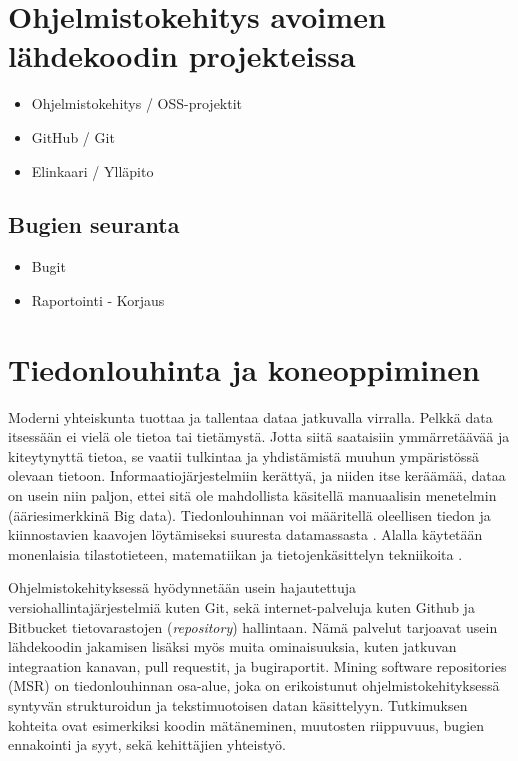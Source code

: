 \documentclass[utf8]{gradu3}
\begin{document}
\chapter{Ohjelmistokehitys avoimen lähdekoodin projekteissa}
\begin{itemize}
  \item Ohjelmistokehitys / OSS-projektit
  \item GitHub / Git
  \item Elinkaari / Ylläpito
\end{itemize}

\section{Bugien seuranta}
\begin{itemize}
  \item Bugit
  \item Raportointi - Korjaus
\end{itemize}
  
\chapter{Tiedonlouhinta ja koneoppiminen}

Moderni yhteiskunta tuottaa ja tallentaa dataa jatkuvalla virralla. Pelkkä data
itsessään ei vielä ole tietoa tai tietämystä. Jotta siitä saataisiin
ymmärretäävää ja kiteytynyttä tietoa, se vaatii tulkintaa ja yhdistämistä muuhun
ympäristössä olevaan tietoon. %
Informaatiojärjestelmiin kerättyä, ja niiden itse
keräämää, dataa on usein niin paljon, ettei sitä ole mahdollista käsitellä
manuaalisin menetelmin (ääriesimerkkinä Big data). Tiedonlouhinnan voi
määritellä oleellisen tiedon ja kiinnostavien kaavojen löytämiseksi suuresta
datamassasta \parencite[][8]{han-data_mining}. Alalla käytetään monenlaisia
tilastotieteen, matematiikan ja tietojenkäsittelyn tekniikoita
\parencite{clifton-2019}. 

Ohjelmistokehityksessä hyödynnetään usein hajautettuja
versiohallintajärjestelmiä kuten Git, sekä internet-palveluja kuten Github ja
Bitbucket tietovarastojen (\textit{repository}) hallintaan. Nämä palvelut
tarjoavat usein lähdekoodin jakamisen lisäksi myös muita ominaisuuksia, kuten
jatkuvan integraation kanavan, pull requestit, ja bugiraportit. Mining software
repositories (MSR) on tiedonlouhinnan osa-alue, joka on erikoistunut
ohjelmistokehityksessä syntyvän strukturoidun ja tekstimuotoisen datan
käsittelyyn. Tutkimuksen kohteita ovat esimerkiksi koodin mätäneminen, muutosten
riippuvuus, bugien ennakointi ja syyt, sekä kehittäjien yhteistyö.
\parencite{guemes-pena-emerging_topics}
\end{document}
